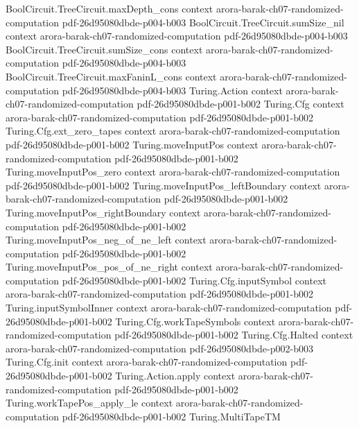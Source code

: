 \begin{theorem}
\proofstep
  {BoolCircuit.TreeCircuit.maxDepth_cons}
  {context}
  {arora-barak-ch07-randomized-computation}
  {pdf-26d95080dbde-p004-b003}
\proofstep
  {BoolCircuit.TreeCircuit.sumSize_nil}
  {context}
  {arora-barak-ch07-randomized-computation}
  {pdf-26d95080dbde-p004-b003}
\proofstep
  {BoolCircuit.TreeCircuit.sumSize_cons}
  {context}
  {arora-barak-ch07-randomized-computation}
  {pdf-26d95080dbde-p004-b003}
\proofstep
  {BoolCircuit.TreeCircuit.maxFaninL_cons}
  {context}
  {arora-barak-ch07-randomized-computation}
  {pdf-26d95080dbde-p004-b003}
\proofstep
  {Turing.Action}
  {context}
  {arora-barak-ch07-randomized-computation}
  {pdf-26d95080dbde-p001-b002}
\proofstep
  {Turing.Cfg}
  {context}
  {arora-barak-ch07-randomized-computation}
  {pdf-26d95080dbde-p001-b002}
\proofstep
  {Turing.Cfg.ext_zero_tapes}
  {context}
  {arora-barak-ch07-randomized-computation}
  {pdf-26d95080dbde-p001-b002}
\proofstep
  {Turing.moveInputPos}
  {context}
  {arora-barak-ch07-randomized-computation}
  {pdf-26d95080dbde-p001-b002}
\proofstep
  {Turing.moveInputPos_zero}
  {context}
  {arora-barak-ch07-randomized-computation}
  {pdf-26d95080dbde-p001-b002}
\proofstep
  {Turing.moveInputPos_leftBoundary}
  {context}
  {arora-barak-ch07-randomized-computation}
  {pdf-26d95080dbde-p001-b002}
\proofstep
  {Turing.moveInputPos_rightBoundary}
  {context}
  {arora-barak-ch07-randomized-computation}
  {pdf-26d95080dbde-p001-b002}
\proofstep
  {Turing.moveInputPos_neg_of_ne_left}
  {context}
  {arora-barak-ch07-randomized-computation}
  {pdf-26d95080dbde-p001-b002}
\proofstep
  {Turing.moveInputPos_pos_of_ne_right}
  {context}
  {arora-barak-ch07-randomized-computation}
  {pdf-26d95080dbde-p001-b002}
\proofstep
  {Turing.Cfg.inputSymbol}
  {context}
  {arora-barak-ch07-randomized-computation}
  {pdf-26d95080dbde-p001-b002}
\proofstep
  {Turing.inputSymbolInner}
  {context}
  {arora-barak-ch07-randomized-computation}
  {pdf-26d95080dbde-p001-b002}
\proofstep
  {Turing.Cfg.workTapeSymbols}
  {context}
  {arora-barak-ch07-randomized-computation}
  {pdf-26d95080dbde-p001-b002}
\proofstep
  {Turing.Cfg.Halted}
  {context}
  {arora-barak-ch07-randomized-computation}
  {pdf-26d95080dbde-p002-b003}
\proofstep
  {Turing.Cfg.init}
  {context}
  {arora-barak-ch07-randomized-computation}
  {pdf-26d95080dbde-p001-b002}
\proofstep
  {Turing.Action.apply}
  {context}
  {arora-barak-ch07-randomized-computation}
  {pdf-26d95080dbde-p001-b002}
\proofstep
  {Turing.workTapePos_apply_le}
  {context}
  {arora-barak-ch07-randomized-computation}
  {pdf-26d95080dbde-p001-b002}
\proofstep
  {Turing.MultiTapeTM}

\end{theorem}
